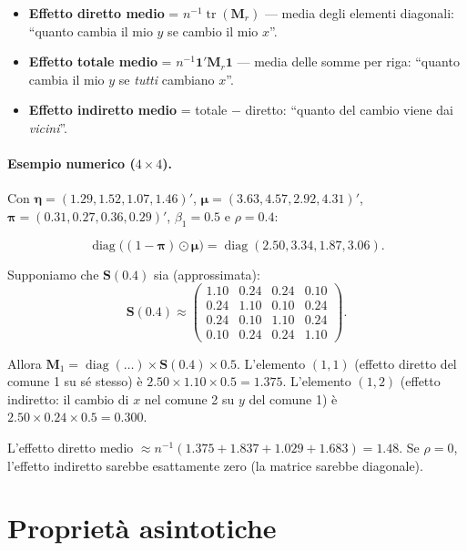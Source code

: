 \documentclass[12pt,a4paper]{article}
\newcommand{\bS}{\mathbf{S}}
\DeclareMathOperator{\diag}{diag}
\DeclareMathOperator{\tr}{tr}
\begin{document}
\begin{itemize}
  \item \textbf{Effetto diretto medio} = $n^{-1}\tr(\mathbf{M}_r)$ --- media degli elementi diagonali: ``quanto cambia il mio $y$ se cambio il mio $x$''.
  \item \textbf{Effetto totale medio} = $n^{-1}\mathbf{1}'\mathbf{M}_r\mathbf{1}$ --- media delle somme per riga: ``quanto cambia il mio $y$ se \emph{tutti} cambiano $x$''.
  \item \textbf{Effetto indiretto medio} = totale $-$ diretto: ``quanto del cambio viene dai \emph{vicini}''.
\end{itemize}

\paragraph{Esempio numerico ($4 \times 4$).}
Con $\boldsymbol{\eta} = (1.29, 1.52, 1.07, 1.46)'$, $\boldsymbol{\mu} = (3.63, 4.57, 2.92, 4.31)'$, $\boldsymbol{\pi} = (0.31, 0.27, 0.36, 0.29)'$, $\beta_1 = 0.5$ e $\rho = 0.4$:

\[
\diag\bigl((1-\boldsymbol{\pi})\odot\boldsymbol{\mu}\bigr) =
\diag(2.50, 3.34, 1.87, 3.06).
\]

Supponiamo che $\bS(0.4)$ sia (approssimata):
\[
\bS(0.4) \approx \begin{pmatrix}
  1.10 & 0.24 & 0.24 & 0.10 \\
  0.24 & 1.10 & 0.10 & 0.24 \\
  0.24 & 0.10 & 1.10 & 0.24 \\
  0.10 & 0.24 & 0.24 & 1.10
\end{pmatrix}.
\]

Allora $\mathbf{M}_1 = \diag(\ldots) \times \bS(0.4) \times 0.5$. L'elemento $(1,1)$ (effetto diretto del comune 1 su s\'e stesso) \`e $2.50 \times 1.10 \times 0.5 = 1.375$. L'elemento $(1,2)$ (effetto indiretto: il cambio di $x$ nel comune 2 su $y$ del comune 1) \`e $2.50 \times 0.24 \times 0.5 = 0.300$.

L'effetto diretto medio $\approx n^{-1}(1.375 + 1.837 + 1.029 + 1.683) = 1.48$.
Se $\rho = 0$, l'effetto indiretto sarebbe esattamente zero (la matrice sarebbe diagonale).

\section{Propriet\`a asintotiche}
\end{document}
